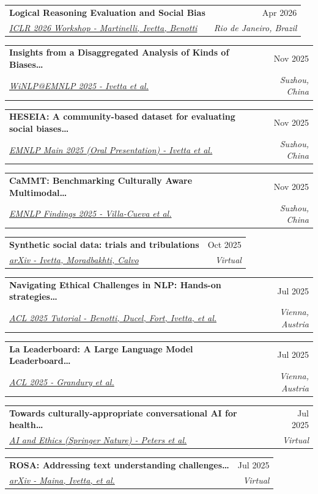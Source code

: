 \documentclass[letterpaper,10pt]{article}
\makeatletter
\def\faExternalLink{\faIcon{external-link-alt}}
\newcommand{\resumeSubheading}[4]{
  \item
    \begin{tabular*}{1.0\textwidth}[t]{l@{\extracolsep{\fill}}r}
      \textbf{#1} & \small #2 \\
      \textit{\small #3} & \textit{\small #4} \\
    \end{tabular*}
}
\makeatother
\begin{document}
    \resumeSubheading{Logical Reasoning Evaluation and Social Bias
    \href{https://openreview.net/forum?id=3KRDaQNUtt}{\raisebox{-0.1\height}\faExternalLink}}{Apr 2026}
    {\underline{ICLR 2026 Workshop - Martinelli, Ivetta, Benotti}}{Rio de Janeiro, Brazil}

    \resumeSubheading{Insights from a Disaggregated Analysis of Kinds of Biases\ldots
    \href{https://aclanthology.org/2025.winlp-main.20/}{\raisebox{-0.1\height}\faExternalLink}}{Nov 2025}
    {\underline{WiNLP@EMNLP 2025 - Ivetta et al.}}{Suzhou, China}

    \resumeSubheading{HESEIA: A community-based dataset for evaluating social biases\ldots
    \href{https://aclanthology.org/2025.emnlp-main.1275/}{\raisebox{-0.1\height}\faExternalLink}}{Nov 2025}
    {\underline{EMNLP Main 2025 (Oral Presentation) - Ivetta et al.}}{Suzhou, China}

    \resumeSubheading{CaMMT: Benchmarking Culturally Aware Multimodal\ldots
    \href{https://aclanthology.org/2025.findings-emnlp.1220/}{\raisebox{-0.1\height}\faExternalLink}}{Nov 2025}
    {\underline{EMNLP Findings 2025 - Villa-Cueva et al.}}{Suzhou, China}

    \resumeSubheading{Synthetic social data: trials and tribulations
    \href{https://arxiv.org/abs/2510.19952}{\raisebox{-0.1\height}\faExternalLink}}{Oct 2025}
    {\underline{arXiv - Ivetta, Moradbakhti, Calvo}}{Virtual}

    \resumeSubheading{Navigating Ethical Challenges in NLP: Hands-on strategies\ldots
    \href{https://aclanthology.org/2025.acl-tutorials.5/}{\raisebox{-0.1\height}\faExternalLink}}{Jul 2025}
    {\underline{ACL 2025 Tutorial - Benotti, Ducel, Fort, Ivetta, et al.}}{Vienna, Austria}

    \resumeSubheading{La Leaderboard: A Large Language Model Leaderboard\ldots
    \href{https://aclanthology.org/2025.acl-long.1561/}{\raisebox{-0.1\height}\faExternalLink}}{Jul 2025}
    {\underline{ACL 2025 - Grandury et al.}}{Vienna, Austria}

    \resumeSubheading{Towards culturally-appropriate conversational AI for health\ldots
    \href{https://link.springer.com/article/10.1007/s43681-026-01196-y}{\raisebox{-0.1\height}\faExternalLink}}{Jul 2025}
    {\underline{AI and Ethics (Springer Nature) - Peters et al.}}{Virtual}
    
    \resumeSubheading{ROSA: Addressing text understanding challenges\ldots
    \href{https://www.arxiv.org/abs/2506.03665}{\raisebox{-0.1\height}\faExternalLink}}{Jul 2025}
    {\underline{arXiv - Maina, Ivetta, et al.}}{Virtual}
\end{document}
